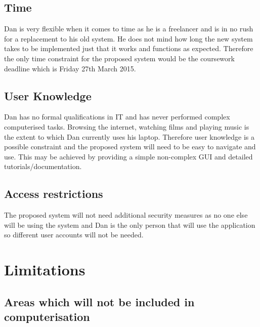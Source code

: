 \subsection{Time}

\begin{flushleft}
 	Dan is very flexible when it comes to time as he is a freelancer and is in no rush for a replacement to his old system. He does not mind how long the new system takes to be implemented just that it works and functions as expected. Therefore the only time constraint for the proposed system would be the coursework deadline which is Friday 27th March 2015.
\end{flushleft}

\subsection{User Knowledge}

\begin{flushleft}
	Dan has no formal qualifications in IT and has never performed complex computerised tasks. Browsing the internet, watching films and playing music is the extent to which Dan currently uses his laptop. Therefore user knowledge is a possible constraint and the proposed system will need to be easy to navigate and use. This may be achieved by providing a simple non-complex GUI and detailed tutorials/documentation.
\end{flushleft}

\subsection{Access restrictions}

\begin{flushleft}

	The proposed system will not need additional security measures as no one else will be using the system and Dan is the only person that will use the application so different user accounts will not be needed. 

\end{flushleft}

\section{Limitations}

\subsection{Areas which will not be included in computerisation}

